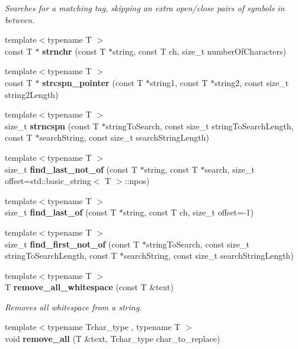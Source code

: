 \begin{DoxyCompactItemize}
\begin{DoxyCompactList}\small\item\em Searches for a matching tag, skipping an extra open/close pairs of symbols in between. \end{DoxyCompactList}\item 
{\footnotesize template$<$typename T $>$ }\\const T $\ast$ {\bf strnchr} (const T $\ast$string, const T ch, size\+\_\+t number\+Of\+Characters)
\item 
{\footnotesize template$<$typename T $>$ }\\const T $\ast$ {\bf strcspn\+\_\+pointer} (const T $\ast$string1, const T $\ast$string2, const size\+\_\+t string2\+Length)
\item 
{\footnotesize template$<$typename T $>$ }\\size\+\_\+t {\bf strncspn} (const T $\ast$string\+To\+Search, const size\+\_\+t string\+To\+Search\+Length, const T $\ast$search\+String, const size\+\_\+t search\+String\+Length)
\item 
{\footnotesize template$<$typename T $>$ }\\size\+\_\+t {\bf find\+\_\+last\+\_\+not\+\_\+of} (const T $\ast$string, const T $\ast$search, size\+\_\+t offset=std\+::basic\+\_\+string$<$ T $>$\+::npos)
\item 
{\footnotesize template$<$typename T $>$ }\\size\+\_\+t {\bf find\+\_\+last\+\_\+of} (const T $\ast$string, const T ch, size\+\_\+t offset=-\/1)
\item 
{\footnotesize template$<$typename T $>$ }\\size\+\_\+t {\bfseries find\+\_\+first\+\_\+not\+\_\+of} (const T $\ast$string\+To\+Search, const size\+\_\+t string\+To\+Search\+Length, const T $\ast$search\+String, const size\+\_\+t search\+String\+Length)\label{namespacestring__util_a3d2321452d97ffab53b920bf86398148}

\item 
{\footnotesize template$<$typename T $>$ }\\T {\bf remove\+\_\+all\+\_\+whitespace} (const T \&text)\label{namespacestring__util_ac601c12172781e135da65305c87bfd50}

\begin{DoxyCompactList}\small\item\em Removes all whitespace from a string. \end{DoxyCompactList}\item 
{\footnotesize template$<$typename Tchar\+\_\+type , typename T $>$ }\\void {\bf remove\+\_\+all} (T \&text, Tchar\+\_\+type char\+\_\+to\+\_\+replace)\label{namespacestring__util_a2f89ea80d36d58f12a5b156aa91d43aa}


\end{DoxyCompactItemize}
